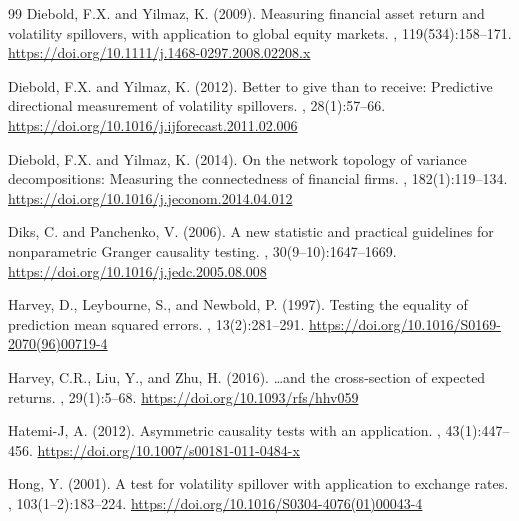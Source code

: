 \documentclass[11pt,a4paper]{article}
\begin{document}
\begin{thebibliography}{99}
Diebold, F.X. and Yilmaz, K. (2009).
\newblock Measuring financial asset return and volatility spillovers, with application to global equity markets.
, 119(534):158--171.
\newblock \url{https://doi.org/10.1111/j.1468-0297.2008.02208.x}

Diebold, F.X. and Yilmaz, K. (2012).
\newblock Better to give than to receive: Predictive directional measurement of volatility spillovers.
, 28(1):57--66.
\newblock \url{https://doi.org/10.1016/j.ijforecast.2011.02.006}

Diebold, F.X. and Yilmaz, K. (2014).
\newblock On the network topology of variance decompositions: Measuring the connectedness of financial firms.
, 182(1):119--134.
\newblock \url{https://doi.org/10.1016/j.jeconom.2014.04.012}

Diks, C. and Panchenko, V. (2006).
\newblock A new statistic and practical guidelines for nonparametric Granger causality testing.
, 30(9--10):1647--1669.
\newblock \url{https://doi.org/10.1016/j.jedc.2005.08.008}

Harvey, D., Leybourne, S., and Newbold, P. (1997).
\newblock Testing the equality of prediction mean squared errors.
, 13(2):281--291.
\newblock \url{https://doi.org/10.1016/S0169-2070(96)00719-4}

Harvey, C.R., Liu, Y., and Zhu, H. (2016).
\newblock \ldots and the cross-section of expected returns.
, 29(1):5--68.
\newblock \url{https://doi.org/10.1093/rfs/hhv059}

Hatemi-J, A. (2012).
\newblock Asymmetric causality tests with an application.
, 43(1):447--456.
\newblock \url{https://doi.org/10.1007/s00181-011-0484-x}

Hong, Y. (2001).
\newblock A test for volatility spillover with application to exchange rates.
, 103(1--2):183--224.
\newblock \url{https://doi.org/10.1016/S0304-4076(01)00043-4}


\end{thebibliography}
\end{document}
